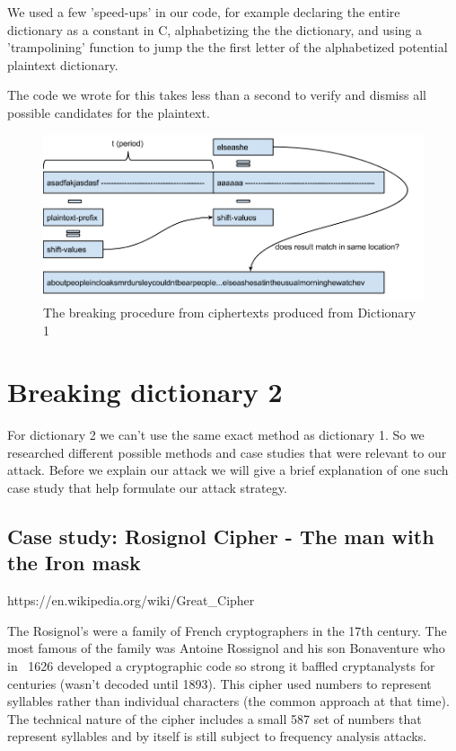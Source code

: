 \documentclass[pdftex,12pt,letter]{article}
\begin{document}
We used a few 'speed-ups' in our code, for example declaring the entire
dictionary as a constant in C, alphabetizing the the dictionary, and 
using a 'trampolining' function to jump the the first letter of the
alphabetized potential plaintext dictionary.  

The code we wrote for this takes less than a second to verify and dismiss all
possible candidates for the plaintext. 

\begin{figure}[ht!]
    \centering
    \includegraphics[width=.8\textwidth]{breaking-dict1}
    \caption{The breaking procedure from ciphertexts produced from Dictionary 1}
    \label{breaking-dict1}
\end{figure}

\section{Breaking dictionary 2}

For dictionary 2 we can't use the same exact method as dictionary 1.
So we researched different possible methods and case studies that were 
relevant to our attack. Before we explain our attack we will give a 
brief explanation of one such case study that help formulate our attack
strategy.  

\subsection{Case study: Rosignol Cipher - The man with the Iron mask}
https://en.wikipedia.org/wiki/Great\_Cipher

The Rosignol's were a family of French cryptographers in the 17th century.
The most famous of the family was Antoine Rossignol and his son Bonaventure
who in ~1626 developed a cryptographic code so strong it baffled cryptanalysts for 
centuries (wasn't decoded until 1893). This cipher used numbers to represent syllables 
rather than individual characters (the common approach at that time). The technical 
nature of the cipher includes a small 587 set of numbers that represent syllables 
and by itself is still subject to frequency analysis attacks. 
\end{document}

